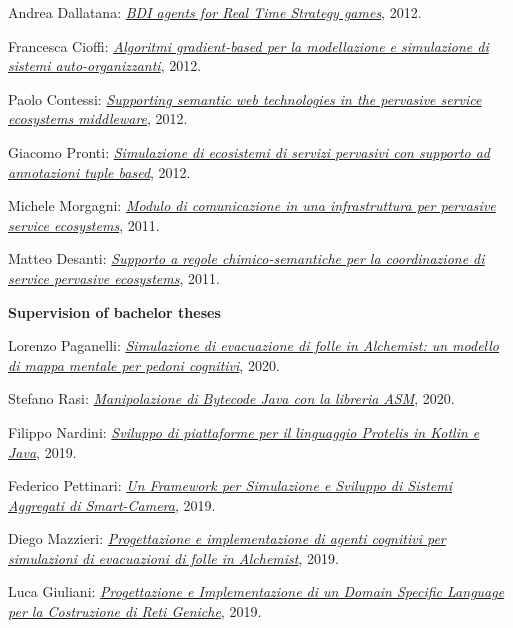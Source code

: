 \begin{outerlist}
\begin{innerlist}
      \item Andrea Dallatana: \href{http://amslaurea.unibo.it/4217/}{\textit{BDI agents for Real Time Strategy games}}, 2012.
      \item Francesca Cioffi: \href{http://amslaurea.unibo.it/4088/}{\textit{Algoritmi gradient-based per la modellazione e simulazione di sistemi auto-organizzanti}}, 2012.
      \item Paolo Contessi: \href{http://amslaurea.unibo.it/4074/}{\textit{Supporting semantic web technologies in the pervasive service ecosystems middleware}}, 2012.
      \item Giacomo Pronti: \href{http://archive.fo/nBeOg}{\textit{Simulazione di ecosistemi di servizi pervasivi con supporto ad annotazioni tuple based}}, 2012.
      \item Michele Morgagni: \href{http://archive.fo/6mnSN}{\textit{Modulo di comunicazione in una infrastruttura per pervasive service ecosystems}}, 2011.
      \item Matteo Desanti: \href{http://archive.fo/rwla1}{\textit{Supporto a regole chimico-semantiche per la coordinazione di service pervasive ecosystems}}, 2011.
    \end{innerlist}
\item[] \textbf{Supervision of bachelor theses} %
    \begin{innerlist}
      \item Lorenzo Paganelli: \href{https://amslaurea.unibo.it/20540/}{\textit{Simulazione di evacuazione di folle in Alchemist: un modello di mappa mentale per pedoni cognitivi}}, 2020.
      \item Stefano Rasi: \href{https://amslaurea.unibo.it/20505/}{\textit{Manipolazione di Bytecode Java con la libreria ASM}}, 2020.
      \item Filippo Nardini: \href{https://amslaurea.unibo.it/19778/}{\textit{Sviluppo di piattaforme per il linguaggio Protelis in Kotlin e Java}}, 2019.
      \item Federico Pettinari: \href{https://amslaurea.unibo.it/19092/}{\textit{Un Framework per Simulazione e Sviluppo di Sistemi Aggregati di Smart-Camera}}, 2019.
      \item Diego Mazzieri: \href{https://amslaurea.unibo.it/19084/}{\textit{Progettazione e implementazione di agenti cognitivi per simulazioni di evacuazioni di folle in Alchemist}}, 2019.
      \item Luca Giuliani: \href{https://amslaurea.unibo.it/19071/}{\textit{Progettazione e Implementazione di un Domain Specific Language per la Costruzione di Reti Geniche}}, 2019.

\end{innerlist}
\end{outerlist}

